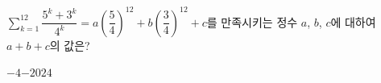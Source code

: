 $\displaystyle\sum_{k=1}^{12} \dfrac{5^k+3^k}{4^k}=a\left(\dfrac{5}{4}\right)^{12}+b\left(\dfrac{3}{4}\right)^{12}+c$를 만족시키는 정수 $a$, $b$, $c$에 대하여 $a+b+c$의 값은?
\begin{choices32}{$-4$}{$-2$}{$0$}{$2$}{$4$}\end{choices32}
